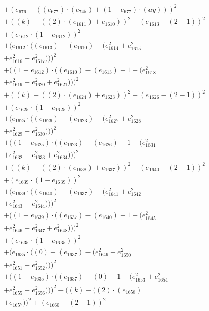 \documentclass[10pt, a4paper]{article}
\begin{document}
\begin{small}
\begin{align*}
& + (e_{676} - ((e_{677})  \cdot  (e_{745}) + (1 - e_{677})  \cdot  (ay)))^{2} \\
& + ((k) - ((2)  \cdot  (e_{1611}) + e_{1610}))^{2} + (e_{1613} - (2 - 1))^{2} \\
& + (e_{1612}  \cdot  (1 - e_{1612}))^{2} \\
& + (e_{1612}  \cdot  ((e_{1613}) - (e_{1610}) - (e_{1614}^{2} + e_{1615}^{2} \\
& + e_{1616}^{2} + e_{1617}^{2})))^{2} \\
& + ((1 - e_{1612})  \cdot  ((e_{1610}) - (e_{1613}) - 1 - (e_{1618}^{2} \\
& + e_{1619}^{2} + e_{1620}^{2} + e_{1621}^{2})))^{2} \\
& + ((k) - ((2)  \cdot  (e_{1624}) + e_{1623}))^{2} + (e_{1626} - (2 - 1))^{2} \\
& + (e_{1625}  \cdot  (1 - e_{1625}))^{2} \\
& + (e_{1625}  \cdot  ((e_{1626}) - (e_{1623}) - (e_{1627}^{2} + e_{1628}^{2} \\
& + e_{1629}^{2} + e_{1630}^{2})))^{2} \\
& + ((1 - e_{1625})  \cdot  ((e_{1623}) - (e_{1626}) - 1 - (e_{1631}^{2} \\
& + e_{1632}^{2} + e_{1633}^{2} + e_{1634}^{2})))^{2} \\
& + ((k) - ((2)  \cdot  (e_{1638}) + e_{1637}))^{2} + (e_{1640} - (2 - 1))^{2} \\
& + (e_{1639}  \cdot  (1 - e_{1639}))^{2} \\
& + (e_{1639}  \cdot  ((e_{1640}) - (e_{1637}) - (e_{1641}^{2} + e_{1642}^{2} \\
& + e_{1643}^{2} + e_{1644}^{2})))^{2} \\
& + ((1 - e_{1639})  \cdot  ((e_{1637}) - (e_{1640}) - 1 - (e_{1645}^{2} \\
& + e_{1646}^{2} + e_{1647}^{2} + e_{1648}^{2})))^{2} \\
& + (e_{1635}  \cdot  (1 - e_{1635}))^{2} \\
& + (e_{1635}  \cdot  ((0) - (e_{1637}) - (e_{1649}^{2} + e_{1650}^{2} \\
& + e_{1651}^{2} + e_{1652}^{2})))^{2} \\
& + ((1 - e_{1635})  \cdot  ((e_{1637}) - (0) - 1 - (e_{1653}^{2} + e_{1654}^{2} \\
& + e_{1655}^{2} + e_{1656}^{2})))^{2} + ((k) - ((2)  \cdot  (e_{1658}) \\
& + e_{1657}))^{2} + (e_{1660} - (2 - 1))^{2} \\

\end{align*}
\end{small}
\end{document}
